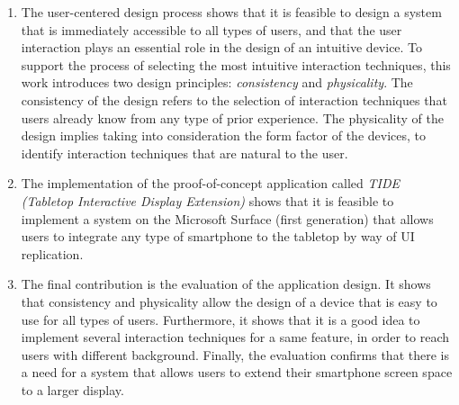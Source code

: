 \begin{enumerate}

\item The user-centered design process shows that it is feasible to design a system that is immediately accessible to all types of users, and that the user interaction plays an essential role in the design of an intuitive device.
To support the process of selecting the most intuitive interaction techniques, this work introduces two design principles: \emph{consistency} and \emph{physicality}.
The consistency of the design refers to the selection of interaction techniques that users already know from any type of prior experience.
The physicality of the design implies taking into consideration the form factor of the devices, to identify interaction techniques that are natural to the user.

\item The implementation of the proof-of-concept application called \emph{TIDE (Tabletop Interactive Display Extension)} shows that it is feasible to implement a system on the Microsoft Surface (first generation) that allows users to integrate any type of smartphone to the tabletop by way of UI replication.

\item The final contribution is the evaluation of the application design.
It shows that consistency and physicality allow the design of a device that is easy to use for all types of users.
Furthermore, it shows that it is a good idea to implement several interaction techniques for a same feature, in order to reach users with different background.
Finally, the evaluation confirms that there is a need for a system that allows users to extend their smartphone screen space to a larger display.

\end{enumerate}

